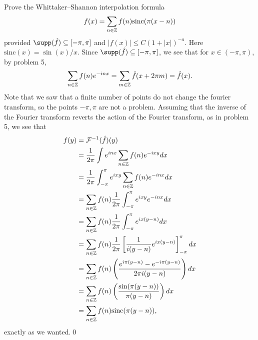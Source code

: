\documentclass{article}
\begin{document}
\newpage
{} Prove the Whittaker–Shannon interpolation formula
\[f(x) = \sum_{n\in \mathbb{Z}}
f(n)\text{sinc}(\pi(x -n))\]
provided $\supp(\hat{f}) \sse [-\pi,\pi]$ and $|f(x)|\le C(1 + |x|)^{-a}$. Here $\text{sinc}(x) = \sin(x)/x$.  \tri
\hop 
\solution
Since $\supp(\hat{f}) \sse [-\pi, \pi]$, we see that for $x \in (-\pi,\pi)$, by problem 5,
\begin{align*}
    \sum_{n \in \mathbb{Z}}f(n) e^{-inx} = \sum_{m \in \mathbb{Z}} \hat{f}(x + 2\pi m) = \hat{f}(x).
\end{align*}
Note that we saw that a finite number of points do not change the fourier transform, so the points $-\pi, \pi$ are not a problem. Assuming that the inverse of the Fourier transform reverts the action of the Fourier transform, as in problem 5, we see that 
\begin{align*}
    f(y) &= \cal{F}\inv(\hat{f})(y) \\
    &= \frac{1}{2\pi}\int e^{inx}\sum_{n\in \ZZ} f(n)e^{-ixy}dx \\
    &= \frac{1}{2\pi}\int_{-\pi}^\pi e^{ixy}\sum_{n\in \ZZ} f(n)e^{-inx}dx \\
    &=\sum_{n\in \ZZ} f(n) \frac{1}{2\pi}\int_{-\pi}^\pi e^{ixy}e^{-inx}dx \\
    &=\sum_{n\in \ZZ} f(n) \frac{1}{2\pi}\int_{-\pi}^\pi e^{ix(y-n)}dx \\
    &=\sum_{n\in \ZZ} f(n) \frac{1}{2\pi}\sbr{\frac{1}{i(y-n)}e^{ix(y-n)}}_{-\pi}^\pi dx \\
    &=\sum_{n\in \ZZ} f(n) \del{\frac{e^{i\pi(y-n)}-e^{-i\pi(y-n)}}{2\pi i(y-n)}} dx\\
    &=\sum_{n\in \ZZ} f(n) \del{\frac{\sin(\pi(y-n))}{\pi (y-n)}} dx\\
    &=\sum_{n\in \ZZ} f(n) \text{sinc}(\pi(y-n)),\\
\end{align*}
exactly as we wanted.\qed
\end{document}
